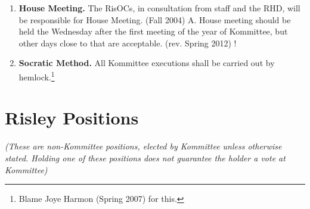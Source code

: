 \documentclass[12pt]{article}
\begin{document}
\begin{enumerate}[1.]
\item \textbf{House Meeting.} The RisOCs, in consultation from staff and the RHD, will be responsible for House Meeting. (Fall 2004) A. House meeting should be held the Wednesday after the first meeting of the year of Kommittee, but other days close to that are acceptable. (rev. Spring 2012) !
\item \textbf{Socratic Method.} All Kommittee executions shall be carried out by hemlock.\footnote{Blame Joye Harmon (Spring 2007) for this.}
\end{enumerate}
\section*{Risley Positions}
\begin{center}\textit{(These are non-Kommittee positions, elected by Kommittee unless otherwise stated. Holding one of these positions does not guarantee the holder a vote at Kommittee)}
\end{center}
\end{document}
